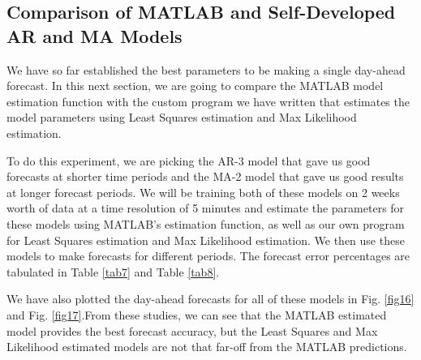 \documentclass[journal]{IEEEtran}
\begin{document}
\subsection{Comparison of MATLAB and Self-Developed AR and MA Models}

We have so far established the best parameters to be making a single day-ahead forecast. In this next section, we are going to compare the MATLAB model estimation function with the custom program we have written that estimates the model parameters using Least Squares estimation and Max Likelihood estimation.

To do this experiment, we are picking the AR-3 model that gave us good forecasts at shorter time periods and the MA-2 model that gave us good results at longer forecast periods. We will be training both of these models on 2 weeks worth of data at a time resolution of 5 minutes and estimate the parameters for these models using MATLAB's estimation function, as well as our own program for Least Squares estimation and Max Likelihood estimation. We then use these models to make forecasts for different periods. The forecast error percentages are tabulated in Table \ref{tab7} and Table \ref{tab8}.

We have also plotted the day-ahead forecasts for all of these models in Fig. \ref{fig16} and Fig. \ref{fig17}.From these studies, we can see that the MATLAB estimated model provides the best forecast accuracy, but the Least Squares and Max Likelihood estimated models are not that far-off from the MATLAB predictions.
\end{document}
